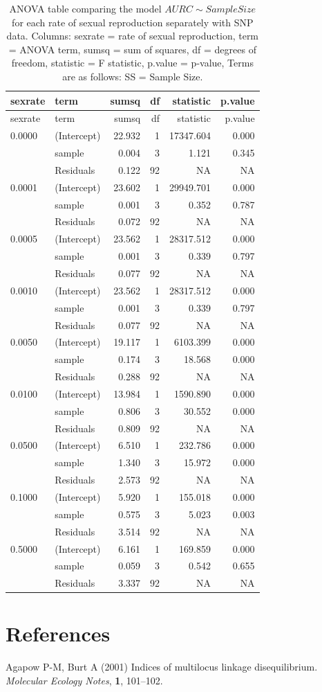 \documentclass[]{article}
\theoremstyle{definition}
\theoremstyle{definition}
\theoremstyle{remark}
\begin{document}
\begin{longtable}[]{@{}llrrrr@{}}
\caption{\label{tab:sim5} ANOVA table comparing the model
\(AURC \sim Sample Size\) for each rate of sexual reproduction
separately with SNP data. Columns: sexrate = rate of sexual
reproduction, term = ANOVA term, sumsq = sum of squares, df = degrees of
freedom, statistic = F statistic, p.value = p-value, Terms are as
follows: SS = Sample Size.}\tabularnewline
\toprule
sexrate & term & sumsq & df & statistic & p.value\tabularnewline
\midrule
\endfirsthead
\toprule
sexrate & term & sumsq & df & statistic & p.value\tabularnewline
\midrule
\endhead
0.0000 & (Intercept) & 22.932 & 1 & 17347.604 & 0.000\tabularnewline
& sample & 0.004 & 3 & 1.121 & 0.345\tabularnewline
& Residuals & 0.122 & 92 & NA & NA\tabularnewline
0.0001 & (Intercept) & 23.602 & 1 & 29949.701 & 0.000\tabularnewline
& sample & 0.001 & 3 & 0.352 & 0.787\tabularnewline
& Residuals & 0.072 & 92 & NA & NA\tabularnewline
0.0005 & (Intercept) & 23.562 & 1 & 28317.512 & 0.000\tabularnewline
& sample & 0.001 & 3 & 0.339 & 0.797\tabularnewline
& Residuals & 0.077 & 92 & NA & NA\tabularnewline
0.0010 & (Intercept) & 23.562 & 1 & 28317.512 & 0.000\tabularnewline
& sample & 0.001 & 3 & 0.339 & 0.797\tabularnewline
& Residuals & 0.077 & 92 & NA & NA\tabularnewline
0.0050 & (Intercept) & 19.117 & 1 & 6103.399 & 0.000\tabularnewline
& sample & 0.174 & 3 & 18.568 & 0.000\tabularnewline
& Residuals & 0.288 & 92 & NA & NA\tabularnewline
0.0100 & (Intercept) & 13.984 & 1 & 1590.890 & 0.000\tabularnewline
& sample & 0.806 & 3 & 30.552 & 0.000\tabularnewline
& Residuals & 0.809 & 92 & NA & NA\tabularnewline
0.0500 & (Intercept) & 6.510 & 1 & 232.786 & 0.000\tabularnewline
& sample & 1.340 & 3 & 15.972 & 0.000\tabularnewline
& Residuals & 2.573 & 92 & NA & NA\tabularnewline
0.1000 & (Intercept) & 5.920 & 1 & 155.018 & 0.000\tabularnewline
& sample & 0.575 & 3 & 5.023 & 0.003\tabularnewline
& Residuals & 3.514 & 92 & NA & NA\tabularnewline
0.5000 & (Intercept) & 6.161 & 1 & 169.859 & 0.000\tabularnewline
& sample & 0.059 & 3 & 0.542 & 0.655\tabularnewline
& Residuals & 3.337 & 92 & NA & NA\tabularnewline
\bottomrule
\end{longtable}

\section*{References}\label{references}

\hypertarget{refs}{}
\hypertarget{ref-Agapow_2001}{}
Agapow P-M, Burt A (2001) Indices of multilocus linkage disequilibrium.
\emph{Molecular Ecology Notes}, \textbf{1}, 101--102.
\end{document}
